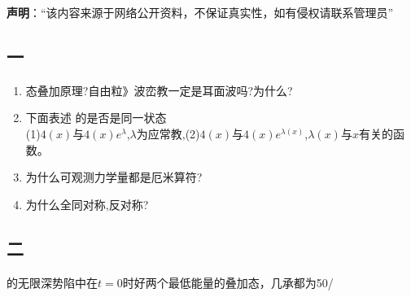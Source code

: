 
\textbf{声明}：“该内容来源于网络公开资料，不保证真实性，如有侵权请联系管理员”

\subsection{一}
\begin{enumerate}
\item 态叠加原理?自由粒》波峦教一定是耳面波吗?为什么?
\item 下面表述 的是否是同一状态\\
(1)$4(x)$与$4(x)e^\lambda$,$\lambda$为应常教,(2)$4(x)$与$4(x)e^{\lambda(x)}$,$\lambda(x)$与$x$有关的函数。
\item 为什么可观测力学量都是厄米算符?
\item 为什么全同对称,反对称?
\end{enumerate}
\subsection{二}
的无限深势陷中在$t=0$时好两个最低能量的叠加态，几承都为50/%
